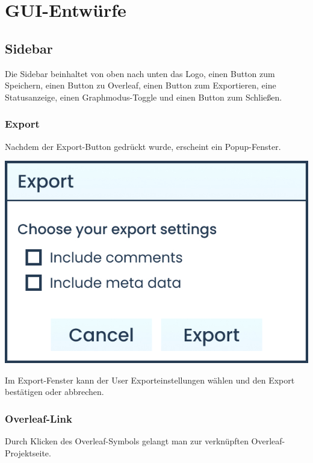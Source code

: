 \clearpage

\section{GUI-Entwürfe}
\label{sec:gui-entwuerfe}
\subsection{Sidebar}
\label{subsec:sidebar}
Die Sidebar beinhaltet von oben nach unten das Logo, einen Button zum Speichern, einen Button zu Overleaf, einen Button
zum Exportieren, eine Statusanzeige, einen Graphmodus-Toggle und einen Button zum Schließen.

\subsubsection{Export}
Nachdem der Export-Button gedrückt wurde, erscheint ein Popup-Fenster.

\begin{center}
\begin{minipage}
{0.5\linewidth}

\includegraphics[width=\textwidth]{assets/img/Export_Box}

\end{minipage}
\end{center}
Im Export-Fenster kann der User Exporteinstellungen wählen und den Export bestätigen oder abbrechen.

\subsubsection{Overleaf-Link}
Durch Klicken des Overleaf-Symbols gelangt man zur verknüpften Overleaf-Projektseite.

